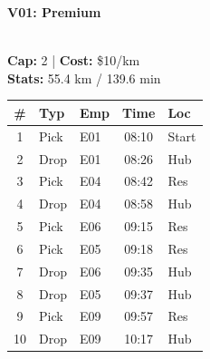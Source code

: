 \documentclass[a4paper,11pt]{article}
\begin{document}
\noindent
\begin{minipage}[t]{0.24\textwidth}
    \centering
    \colorbox{velorablue}{\parbox{\dimexpr\linewidth-2\fboxsep}{\centering \color{white}\textbf{V01: Premium}}} \\
    \vspace{0.05cm}
    {\tiny \textbf{Cap:} 2 | \textbf{Cost:} \$10/km \\ \textbf{Stats:} 55.4 km / 139.6 min}
    \vspace{0.05cm}
    
    \renewcommand{\arraystretch}{0.9}
    \setlength{\tabcolsep}{1pt}
    \tiny
    \begin{tabular}{c l l c l}
        \toprule
        \textbf{\#} & \textbf{Typ} & \textbf{Emp} & \textbf{Time} & \textbf{Loc} \\
        \midrule
        1 & Pick & E01 & 08:10 & Start \\
        \rowcolor{headergray} 2 & Drop & E01 & 08:26 & Hub \\
        3 & Pick & E04 & 08:42 & Res \\
        \rowcolor{headergray} 4 & Drop & E04 & 08:58 & Hub \\
        5 & Pick & E06 & 09:15 & Res \\
        \rowcolor{headergray} 6 & Pick & E05 & 09:18 & Res \\
        7 & Drop & E06 & 09:35 & Hub \\
        \rowcolor{headergray} 8 & Drop & E05 & 09:37 & Hub \\
        9 & Pick & E09 & 09:57 & Res \\
        \rowcolor{headergray} 10 & Drop & E09 & 10:17 & Hub \\
        \bottomrule
    \end{tabular}
\end{minipage}
\hfill
\end{document}
